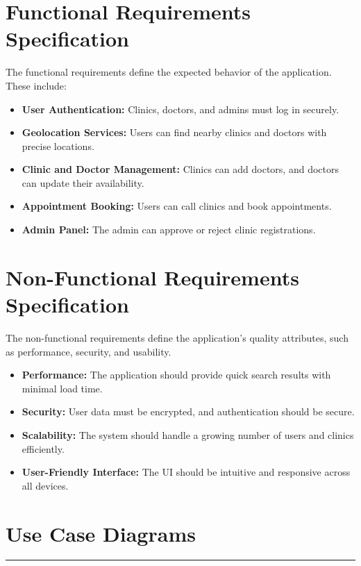 \documentclass[12pt]{report}
\begin{document}
\section{\textbf{Functional Requirements Specification}}

\noindent The functional requirements define the expected behavior of the application. These include:

\begin{itemize}
	\item \textbf{User Authentication:} Clinics, doctors, and admins must log in securely.
	\item \textbf{Geolocation Services:} Users can find nearby clinics and doctors with precise locations.
	\item \textbf{Clinic and Doctor Management:} Clinics can add doctors, and doctors can update their availability.
	\item \textbf{Appointment Booking:} Users can call clinics and book appointments.
	\item \textbf{Admin Panel:} The admin can approve or reject clinic registrations.
\end{itemize}

\section{\textbf{Non-Functional Requirements Specification}}

\noindent The non-functional requirements define the application's quality attributes, such as performance, security, and usability.

\begin{itemize}
	\item \textbf{Performance:} The application should provide quick search results with minimal load time.
	\item \textbf{Security:} User data must be encrypted, and authentication should be secure.
	\item \textbf{Scalability:} The system should handle a growing number of users and clinics efficiently.
	\item \textbf{User-Friendly Interface:} The UI should be intuitive and responsive across all devices.
\end{itemize}


\section{\textbf{Use Case Diagrams}}
\rule{0.45\linewidth}{0.7pt}
\end{document}
